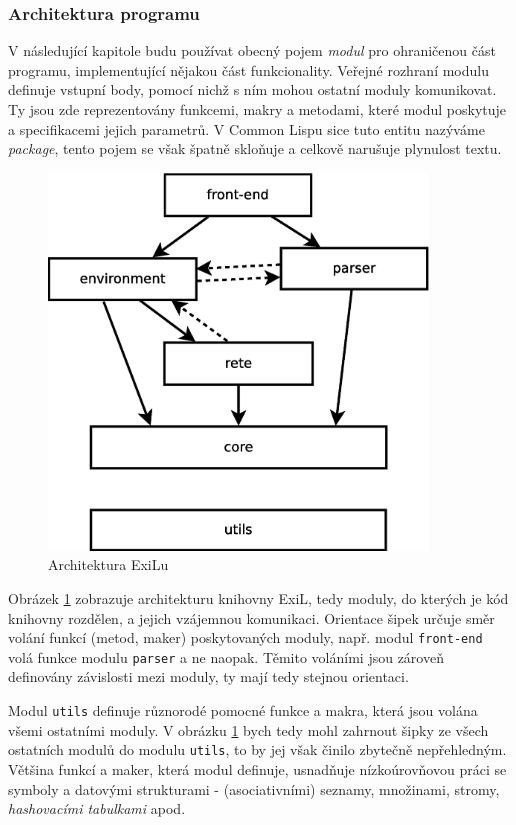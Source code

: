 \subsubsection{Architektura programu}

V následující kapitole budu používat obecný pojem \emph{modul} pro ohraničenou část
programu, implementující nějakou část funkcionality. Veřejné rozhraní modulu
definuje vstupní body, pomocí nichž s ním mohou ostatní moduly komunikovat.
Ty jsou zde reprezentovány funkcemi, makry a metodami, které modul poskytuje
a specifikacemi jejich parametrů. V Common Lispu sice tuto entitu nazýváme
\emph{package}, tento pojem se však špatně skloňuje a celkově narušuje plynulost
textu.

\begin{figure}[h]
\centering
\includegraphics[height=10cm]{modules.eps}
\caption{Architektura ExiLu}
\label{modules}
\end{figure}

Obrázek \ref{modules} zobrazuje architekturu knihovny ExiL, tedy moduly, do
kterých je kód knihovny rozdělen, a jejich vzájemnou komunikaci. Orientace šipek
určuje směr volání funkcí (metod, maker) poskytovaných moduly, např. modul
\verb|front-end| volá funkce modulu \verb|parser| a ne naopak. Těmito voláními
jsou zároveň definovány závislosti mezi moduly, ty mají tedy stejnou orientaci.

Modul \verb|utils| definuje různorodé pomocné funkce a makra, která jsou volána
všemi ostatními moduly. V obrázku \ref{modules} bych tedy mohl zahrnout šipky ze
všech ostatních modulů do modulu \verb|utils|, to by jej však činilo zbytečně
nepřehledným. Většina funkcí a maker, která modul definuje, usnadňuje
nízkoúrovňovou práci se symboly a datovými strukturami - (asociativními)
seznamy, množinami, stromy, \emph{hashovacími tabulkami} apod.

